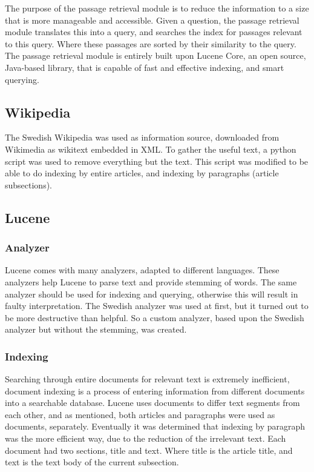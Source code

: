 The purpose of the passage retrieval module is to reduce the information to a size that is more manageable 
and accessible.
Given a question, the passage retrieval module translates this into a query, and searches the index for passages 
relevant to this query. Where these passages are sorted by their similarity to the query.
The passage retrieval module is entirely built upon Lucene Core, an open source, Java-based library, 
that is capable of fast and effective indexing, and smart querying. \cite{lucenecore}

\subsection{Wikipedia}
The Swedish Wikipedia was used as information source, downloaded from Wikimedia \cite{wikimedia} as wikitext embedded in XML.
To gather the useful text, a python script\cite{wikiextractor} was used to remove everything but the text. 
This script was modified to be able to do indexing by entire articles, and indexing by paragraphs (article subsections).

\subsection{Lucene}

\subsubsection{Analyzer}
Lucene comes with many analyzers, adapted to different languages. 
These analyzers help Lucene to parse text and provide stemming of words.
The same analyzer should be used for indexing and querying, otherwise this will result in faulty interpretation.
The Swedish analyzer was used at first, but it turned out to be more destructive than helpful. 
So a custom analyzer, based upon the Swedish analyzer but without the stemming, was created.

\subsubsection{Indexing}
Searching through entire documents for relevant text is extremely inefficient, 
document indexing is a process of entering information from different documents into a searchable database. 
Lucene uses documents to differ text segments from each other, and as mentioned, both articles and paragraphs were used as documents, separately.
Eventually it was determined that indexing by paragraph was the more efficient way, due to the reduction of the irrelevant text.
Each document had two sections, title and text. Where title is the article title, and text is the text body of the current subsection.


